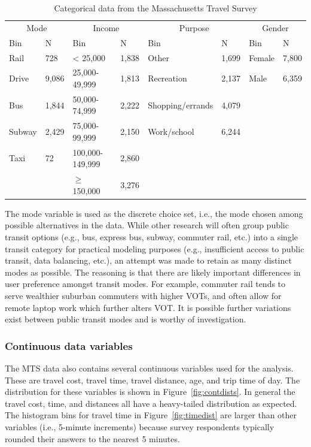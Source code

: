 \documentclass[numbered]{trbunofficial}\usepackage[]{graphicx}\usepackage[]{color}
\begin{document}
\begin{table}[!h]
\centering
\caption{Categorical data from the Massachusetts Travel Survey}
\label{tab:catdata}
\begingroup\fontsize{9}{11}\selectfont

\begin{tabular}{llllllll}
\toprule
\multicolumn{2}{c}{Mode} & \multicolumn{2}{c}{Income} & \multicolumn{2}{c}{Purpose} & \multicolumn{2}{c}{Gender} \\
\cmidrule(l{3pt}r{3pt}){1-2} \cmidrule(l{3pt}r{3pt}){3-4} \cmidrule(l{3pt}r{3pt}){5-6} \cmidrule(l{3pt}r{3pt}){7-8}
Bin & N & Bin & N & Bin & N & Bin & N\\
\midrule
Rail & 728 & < 25,000 & 1,838 & Other & 1,699 & Female & 7,800\\
Drive & 9,086 & 25,000-49,999 & 1,813 & Recreation & 2,137 & Male & 6,359\\
Bus & 1,844 & 50,000-74,999 & 2,222 & Shopping/errands & 4,079 &  & \\
Subway & 2,429 & 75,000-99,999 & 2,150 & Work/school & 6,244 &  & \\
Taxi & 72 & 100,000-149,999 & 2,860 &  &  &  & \\
 &  & $\geq$ 150,000 & 3,276 &  &  &  & \\
\bottomrule
\end{tabular}
\endgroup{}


\end{table}
The mode variable is used as the discrete choice set, i.e., the mode chosen among possible alternatives in the data. While other research will often group public transit options (e.g., bus, express bus, subway, commuter rail, etc.) into a single transit category for practical modeling purposes (e.g., insufficient access to public transit, data balancing, etc.), an attempt was made to retain as many distinct modes as possible. The reasoning is that there are likely important differences in user preference amongst transit modes. For example, commuter rail tends to serve wealthier suburban commuters with higher VOTs, and often allow for remote laptop work which further alters VOT. It is possible further variations exist between public transit modes and is worthy of investigation. 

\subsubsection{Continuous data variables}
The MTS data also contains several continuous variables used for the analysis. These are travel cost, travel time, travel distance, age, and trip time of day. The distribution for these variables is shown in Figure~\ref{fig:contdists}. In general the travel cost, time, and distances all have a heavy-tailed distribution as expected. The histogram bins for travel time in Figure~\ref{fig:timedist} are larger than other variables (i.e., 5-minute increments) because survey respondents typically rounded their answers to the nearest 5 minutes.
\end{document}
